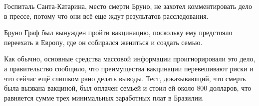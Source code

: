 Госпиталь Санта-Катарина, место смерти Бруно, не захотел комментировать дело в
прессе, потому что они всё еще ждут результатов расследования.

Бруно Граф был вынужден пройти вакцинацию, поскольку ему предстояло переехать в
Европу, где он собирался жениться и создать семью.

Как обычно, основные средства массовой информации проигнорировали это дело, а
правительство сообщило, что преимущества вакцинации перевешивают риски и что
сейчас ещё слишком рано делать выводы. Тест, доказывающий, что смерть была
вызвана вакциной, был оплачен семьей и стоил ей около 800 долларов, что
равняется сумме трех минимальных заработных плат в Бразилии.


